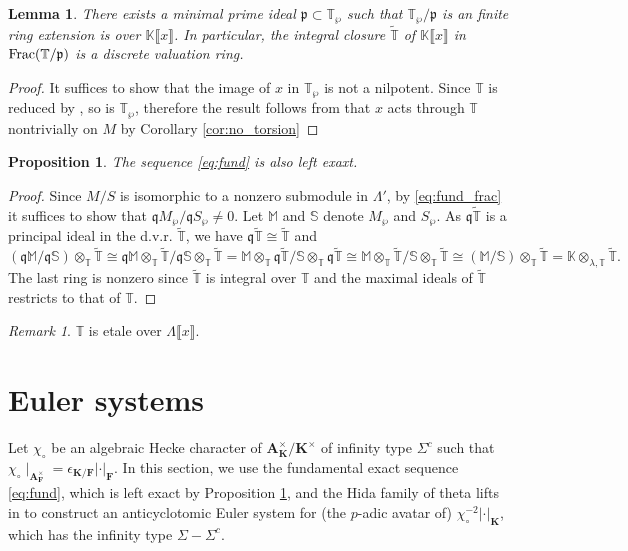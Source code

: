 \documentclass[leqno]{amsart}
\newtheorem{lem}[thm]{Lemma}
\newtheorem{prop}[thm]{Proposition}
\theoremstyle{definition}
\theoremstyle{remark}
\newtheorem{rem}[thm]{Remark}
\newcommand{\A}{\mathbf A}
\newcommand{\fp}{\mathfrak{p}}
\newcommand{\fq}{\mathfrak{q}}
\newcommand{\F}{{\mathbf{F}}} %
\newcommand{\K}{{\mathbf{K}}} %
\newcommand{\qch}{\epsilon} %
\newcommand{\TT}{\mathbb{T}} %
\begin{document}
\begin{lem}
	There exists a minimal prime ideal
	$\fp\subset \TT_{\wp}$
	such that $\TT_{\wp}/\fp$
	is an finite ring extension
	is over $\mathbb{K}\llbracket x\rrbracket$.
	In particular,
	the integral closure $\tilde{\TT}$
	of $\mathbb{K}\llbracket x\rrbracket$
	in $\textnormal{Frac}(\TT/\fp)$
	is a discrete valuation ring.
\end{lem}
\begin{proof}
	It suffices to show that 
	the image of $x$ in  $\TT_\wp$
	is not a nilpotent.
	Since $\TT$ is reduced 
	by \cite[Lem 2.14]{ger}, 
	so is $\TT_\wp$,
	therefore the result follows from that
	$x$ acts through  $\TT$ nontrivially
	on  $M$ by Corollary \ref{cor:no_torsion}
\end{proof}

\begin{prop}\label{prop:fund}
	The sequence \eqref{eq:fund} is also left exaxt.
\end{prop}
\begin{proof}
	Since $M/S$ is isomorphic to a nonzero submodule 
	in  $\Lambda'$,
	by \eqref{eq:fund_frac} it suffices to show that 
	$\fq M_\wp/\fq S_\wp\neq 0$.
	Let $\mathbb{M}$ and  $\mathbb{S}$
	denote  $M_\wp$ and $S_\wp$.
	As $\fq\tilde{\TT}$ is a principal ideal
	in the d.v.r. $\tilde{\TT}$,
	we have $\fq\tilde{\TT}\cong \tilde{\TT}$ and 
\[
	(\fq \mathbb{M}/\fq \mathbb{S})\otimes_\TT
	\tilde{\TT}\cong
	\fq\mathbb{M}\otimes_\TT\tilde{\TT}/
	\fq\mathbb{S}\otimes_\TT\tilde{\TT}=
	\mathbb{M}\otimes_\TT\fq\tilde{\TT}/
	\mathbb{S}\otimes_\TT\fq\tilde{\TT} \cong 
	\mathbb{M}\otimes_\TT\tilde{\TT}/
	\mathbb{S}\otimes_\TT\tilde{\TT}\cong
	(\mathbb{M}/\mathbb{S})\otimes_\TT\tilde{\TT}=
	\mathbb{K}\otimes_{\lambda,\TT}\tilde{\TT}.
\]
The last ring is nonzero since 
$\tilde{\TT}$ is integral over $\TT$
and the maximal ideals of  $ \tilde{\TT}$ 
restricts to that of $\TT$.
\end{proof}

\begin{rem}
$\TT$ is etale over  $\Lambda\llbracket x\rrbracket$.
\end{rem}

\section{Euler systems}

Let $\chi_\circ$ be an algebraic Hecke
character of $\A_{\K}^\times/\K^\times$
of infinity type $\Sigma^c$ such that 
$\chi_\circ\mid_{\A_\F^\times}=\qch_{\K/\F}|\cdot|_\F$.
In this section,
we use the fundamental exact sequence
\eqref{eq:fund}, which is left exact
by Proposition \ref{prop:fund},
and the Hida family of theta lifts in \cite{lee}
to construct an anticyclotomic Euler system
for (the $p$-adic avatar of) $\chi_\circ^{-2}|\cdot|_\K$,
which has the infinity type $\Sigma-\Sigma^c$.
\end{document}
